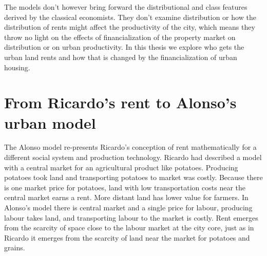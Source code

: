The models don't however bring forward the distributional and class features derived by the classical economists. They don't examine distribution or how the distribution of rents might affect the productivity of the city, which means they throw no light on the effects of financialization of the property market on distribution or on urban productivity. 
In this thesis we  explore who gets the urban land rents and how that is changed by the financialization of urban housing.









\section{From Ricardo's rent to Alonso's urban model}
The Alonso model  re-presents Ricardo's conception of rent mathematically for a different social system and production technology. Ricardo had described a model with a central market for an agricultural product like potatoes. Producing potatoes took land and transporting potatoes to market was costly. Because there is one market price for potatoes, land with low transportation costs near the central market earns a rent. More distant land has lower value for farmers. In Alonso's model there is central market and a single price for labour, producing labour takes land, and transporting labour to the market is costly. Rent emerges from the scarcity of space close to the labour market at the city core, just as  in Ricardo it emerges from the scarcity of land near the market for potatoes and grains. 

